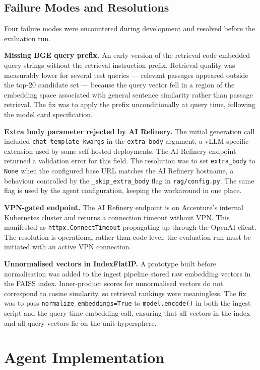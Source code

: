 \subsection{Failure Modes and Resolutions}

Four failure modes were encountered during development and resolved before the evaluation run.

\textbf{Missing BGE query prefix.} An early version of the retrieval code embedded query strings without the retrieval instruction prefix. Retrieval quality was measurably lower for several test queries — relevant passages appeared outside the top-20 candidate set — because the query vector fell in a region of the embedding space associated with general sentence similarity rather than passage retrieval. The fix was to apply the prefix unconditionally at query time, following the model card specification.

\textbf{Extra body parameter rejected by AI Refinery.} The initial generation call included \texttt{chat\_template\_kwargs} in the \texttt{extra\_body} argument, a vLLM-specific extension used by some self-hosted deployments. The AI Refinery endpoint returned a validation error for this field. The resolution was to set \texttt{extra\_body} to \texttt{None} when the configured base URL matches the AI Refinery hostname, a behaviour controlled by the \texttt{\_skip\_extra\_body} flag in \texttt{rag/config.py}. The same flag is used by the agent configuration, keeping the workaround in one place.

\textbf{VPN-gated endpoint.} The AI Refinery endpoint is on Accenture's internal Kubernetes cluster and returns a connection timeout without VPN. This manifested as \texttt{httpx.ConnectTimeout} propagating up through the OpenAI client. The resolution is operational rather than code-level: the evaluation run must be initiated with an active VPN connection.

\textbf{Unnormalised vectors in IndexFlatIP.} A prototype built before normalisation was added to the ingest pipeline stored raw embedding vectors in the FAISS index. Inner-product scores for unnormalised vectors do not correspond to cosine similarity, so retrieval rankings were meaningless. The fix was to pass \texttt{normalize\_embeddings=True} to \texttt{model.encode()} in both the ingest script and the query-time embedding call, ensuring that all vectors in the index and all query vectors lie on the unit hypersphere.

\section{Agent Implementation}
\label{sec:agent-impl}

